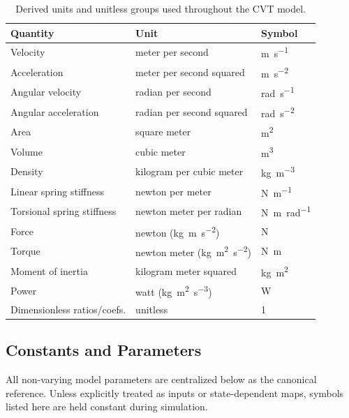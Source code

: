 \documentclass[11pt]{article}
\numberwithin{equation}{section}
\begin{document}
\begin{table}[H]
\centering
\begin{tabular}{@{}lll@{}}
\toprule
Quantity & Unit & Symbol \\ \midrule
Velocity & meter per second & \si{\meter\per\second} \\
Acceleration & meter per second squared & \si{\meter\per\second\squared} \\
Angular velocity & radian per second & \si{\radian\per\second} \\
Angular acceleration & radian per second squared & \si{\radian\per\second\squared} \\
Area & square meter & \si{\meter\squared} \\
Volume & cubic meter & \si{\meter\cubed} \\
Density & kilogram per cubic meter & \si{\kilogram\per\meter\cubed} \\
Linear spring stiffness & newton per meter & \si{\newton\per\meter} \\
Torsional spring stiffness & newton meter per radian & \si{\newton\meter\per\radian} \\
Force & newton (\si{\kilogram\meter\per\second\squared}) & \si{\newton} \\
Torque & newton meter (\si{\kilogram\meter\squared\per\second\squared}) & \si{\newton\meter} \\
Moment of inertia & kilogram meter squared & \si{\kilogram\meter\squared} \\
Power & watt (\si{\kilogram\meter\squared\per\second\cubed}) & \si{\watt} \\
Dimensionless ratios/coefs. & unitless & 1 \\
\bottomrule
\end{tabular}
\caption{Derived units and unitless groups used throughout the CVT model.}
\label{tab:si_derived}
\end{table}

\subsection{Constants and Parameters}\label{sec:constants}

All non-varying model parameters are centralized below as the canonical reference.
Unless explicitly treated as inputs or state-dependent maps, symbols listed here are held constant during simulation.
\end{document}
